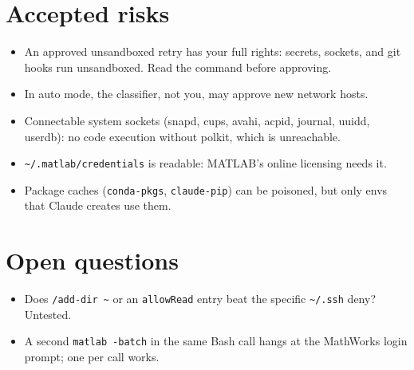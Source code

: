 \documentclass[10pt,a4paper]{article}
\newcommand{\p}[1]{\nolinkurl{#1}}
\begin{document}
\section{Accepted risks}
\begin{itemize}
\item An approved unsandboxed retry has your full rights: secrets, sockets, and git hooks run unsandboxed.
  Read the command before approving.
\item In auto mode, the classifier, not you, may approve new network hosts.
\item Connectable system sockets (snapd, cups, avahi, acpid, journal, uuidd, userdb): no code execution without polkit,
  which is unreachable.
\item \p{~/.matlab/credentials} is readable: MATLAB's online licensing needs it.
\item Package caches (\p{conda-pkgs}, \p{claude-pip}) can be poisoned, but only envs that Claude creates use them.
\end{itemize}

\section{Open questions}
\begin{itemize}
\item Does \p{/add-dir}\ \p{~} or an \p{allowRead} entry beat the specific \p{~/.ssh} deny? Untested.
\item A second \p{matlab}\ \p{-batch} in the same Bash call hangs at the MathWorks login prompt; one per call works.
\end{itemize}
\end{document}
